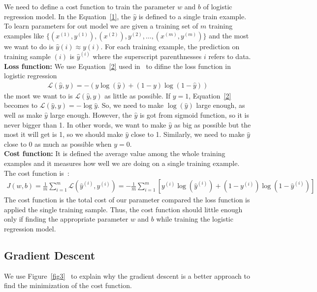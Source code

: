 \documentclass[a4paper]{article}
\begin{document}
We need to define a cost function to train the parameter $w$ and $b$ of logistic regression model. In the Equation~\ref{1}, the $\hat{y}$ is defined to a single train example. To learn parameters for out model we are given a training set of $m$ training examples like $\{(x^{(1)},y^{(1)}),(x^{(2)}),y^{(2)},\dots,(x^{(m)},y^{(m)})\}$ and the most we want to do is $\hat{y}(i) \approx y(i)$. For each training example, the prediction on training sample $(i)$ is $\hat{y}^{(i)}$ where the superscript parenthnesses $i$ refers to data. \\
{\bf Loss function:} We use Equation~\ref{2} used in~\cite{Neural} to difine the loss function in logistic regression~\cite{Neural}\\
\begin{gather}
\mathcal{L}(\hat{y},y) = -(y\log(\hat{y}) + (1 - y)\log(1 - \hat{y}))
\label{2}
\end{gather}
the most we want to is $\mathcal{L}(\hat{y},y)$ as little as possible. If $y = 1$, Equation~\ref{2} becomes to $\mathcal{L}(\hat{y},y) = -\log{\hat{y}}$. So, we need to make $\log(\hat{y})$ large enough, as well as make $\hat{y}$ large enough. However, the $\hat{y}$ is got from sigmoid function, so it is never bigger than 1. In other words, we want to make $\hat{y}$ as big as possible but the most it will get is 1, so we should make $\hat{y}$ close to 1. Similarly, we need to make $\hat{y}$ close to 0 as much as possible when $y = 0$.\\
{\bf Cost function:} It is defined the average value among the whole training examples and it measures how well we are doing on a single training example. The cost function is~\cite{Neural}:\\
\begin{gather}
J(w,b) = \frac{1}{m}\sum_{i=1}^m\mathcal{L}(\hat{y}^{(i)},y^{(i)}) = -\frac{1}{m}\sum_{i=1}^m[y^{(i)}\log(\hat{y}^{(i)}) + (1 - y^{(i)})\log(1 - \hat{y}^{(i)})]
\end{gather}
The cost function is the total cost of our parameter compared the loss function is applied the single training sample. Thus, the cost function should little enough only if finding the appropriate parameter $w$ and $b$ while training the logistic regression model.

\subsection{Gradient Descent}

We use Figure~\ref{fig3}~\cite{Neural} to explain why the gradient descent is a better approach to find the minimization of the cost function.
\end{document}

